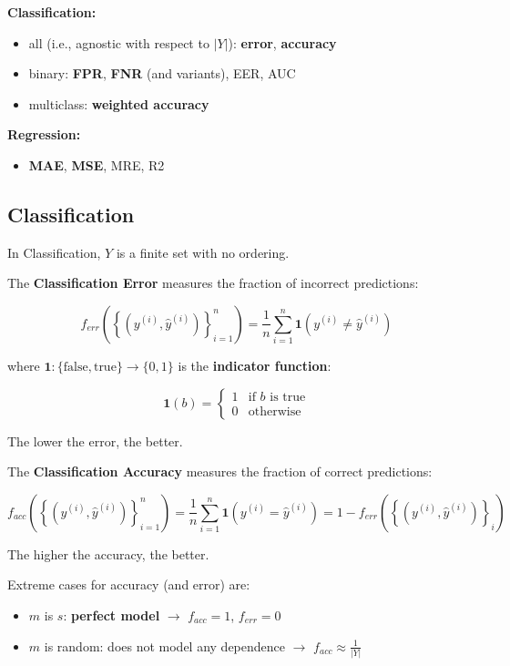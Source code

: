 \begin{exampleblock}
    \textbf{Classification:}
    \begin{itemize}[noitemsep]
        \item all (i.e., agnostic with respect to $|Y|$): \textbf{error}, \textbf{accuracy}
        \item binary: \textbf{FPR}, \textbf{FNR} (and variants), EER, AUC
        \item multiclass: \textbf{weighted accuracy}
    \end{itemize}
    \textbf{Regression:}
    \begin{itemize}[noitemsep]
        \item \textbf{MAE}, \textbf{MSE}, MRE, R2
    \end{itemize}
\end{exampleblock}

\subsection{Classification}

In Classification, $Y$ is a finite set with no ordering.

The \textbf{Classification Error} measures the fraction of incorrect predictions:

$$
f_{err}\left(\left\{(y^{(i)}, \hat{y}^{(i)})\right\}_{i=1}^{n}\right) = \frac{1}{n}\sum_{i=1}^{n}\mathbf{1}(y^{(i)} \neq \hat{y}^{(i)})
$$

where $\mathbf{1} : \{\text{false}, \text{true}\} \to \{0, 1\}$ is the \textbf{indicator function}:

$$
\mathbf{1}(b) = \begin{cases} 1 & \text{if } b \text{ is true} \\ 0 & \text{otherwise} \end{cases}
$$

The lower the error, the better.

\medskip

The \textbf{Classification Accuracy} measures the fraction of correct predictions:

$$
f_{acc}\left(\left\{(y^{(i)}, \hat{y}^{(i)})\right\}_{i=1}^{n}\right) = \frac{1}{n}\sum_{i=1}^{n}\mathbf{1}(y^{(i)} = \hat{y}^{(i)}) = 1 - f_{err}\left(\left\{(y^{(i)}, \hat{y}^{(i)})\right\}_{i}\right)
$$

The higher the accuracy, the better.

\medskip

Extreme cases for accuracy (and error) are:
\begin{itemize}
    \item $m$ is $s$: \textbf{perfect model} $\to$ $f_{acc} = 1$, $f_{err} = 0$
    \item $m$ is random: does not model any dependence $\to$ $f_{acc} \approx \frac{1}{|Y|}$
\end{itemize}

